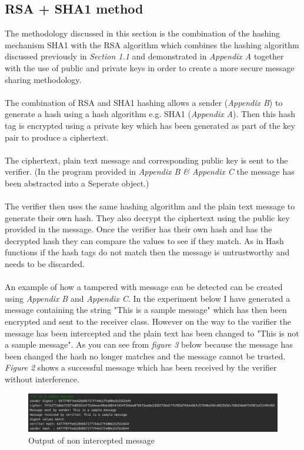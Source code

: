\documentclass[a4paper, twoside, 11pt]{article}
\begin{document}
\subsection{RSA + SHA1 method}
The methodology discussed in this section is the combination of the hashing mechanism SHA1 with the RSA algorithm which combines the hashing algorithm discussed previously in \textit{Section 1.1} and demonstrated in \textit{Appendix A} together with the use of public and private keys in order to create a more secure message sharing methodology. \\
\\
The combination of RSA and SHA1 hashing allows a sender (\textit{Appendix B}) to generate a hash using a hash algorithm e.g. SHA1 (\textit{Appendix A}). Then this hash tag is encrypted using a private key which has been generated as part of the key pair to produce a ciphertext.\\
\\
The ciphertext, plain text message and corresponding public key is sent to the verifier. (In the program provided in \textit{Appendix B \& Appendix C} the message has been abstracted into a Seperate object.)\\
\\
The verifier then uses the same hashing algorithm and the plain text message to generate their own hash. They also decrypt the ciphertext using the public key provided in the message. Once the verifier has their own hash and has the decrypted hash they can compare the values to see if they match. As in Hash functions if the hash tags do not match then the message is untrustworthy and needs to be discarded. \\
\\
An example of how a tampered with message can be detected can be created using \textit{Appendix B} and \textit{Appendix C}. In the experiment below I have generated a message containing the string "This is a sample message" which has then been encrypted and sent to the receiver class. However on the way to the varifier the message has been intercepted and the plain text has been changed to "This is not a sample message". As you can see from \textit{figure 3} below because the message has been changed the hash no longer matches and the message cannot be trusted. \textit{Figure 2} shows a successful message which has been received by the verifier without interference.

\begin{figure}[H]
	\centering
	\includegraphics[scale=0.5]{Images/successMessage.png}
  \caption{Output of non intercepted message}
\end{figure}
\end{document}
